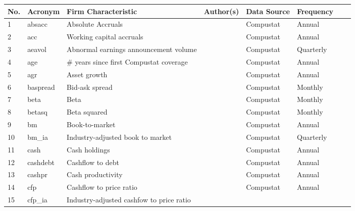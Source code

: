 \documentclass[a4paper, table]{article}
\begin{document}
\begin{landscape}
	\begin{center}
		\begin{longtable}{llllllll} \hline 
			No. & Acronym & Firm Characteristic & Author(s) & Data Source & Frequency \\ \hline
			1 & absacc\footnotemark[\value{footnote}] & Absolute Accruals & 
				\cite{bandyopadhyay_accrual_2010} & Compustat & Annual \\
			2 & acc\footnotemark[\value{footnote}] & Working capital accruals & 
				\cite{sloan_stock_1996} & Compustat & Annual \\
			3 & aeavol & Abnormal earnings announcement volume & 
				\cite{lerman_high-volume_2008} & Compustat & Quarterly \\
			4 & age & \# years since first Compustat coverage & 
				\cite{jiang_information_2005} & Compustat & Annual \\
			5 & agr & Asset growth & 
				\cite{cooper_asset_2008} & Compustat & Annual \\
			6 & baspread & Bid-ask spread & 
				\cite{amihud_effects_1989} & Compustat & Monthly \\
			7 & beta & Beta & 
				\cite{fama_risk_1973} & Compustat & Monthly \\
			8 & betasq & Beta squared & 
				\cite{fama_risk_1973} & Compustat & Monthly \\
			9 & bm & Book-to-market & 
				\cite{rosenberg_persuasive_1985} & Compustat & Annual \\
			10 & bm\_ia & Industry-adjusted book to market & 
				\cite{asness_predicting_2000} & Compustat & Quarterly \\
			11 & cash & Cash holdings & 
				\cite{palazzo_cash_2012} & Compustat & Annual \\
			12 & cashdebt & Cashflow to debt & 
				\cite{ou_financial_1989} & Compustat & Annual \\
			13 & cashpr & Cash productivity & 
				\cite{chandrashekar_productivity_2009} & Compustat & Annual \\
			14 & cfp\footnotemark[\value{footnote}] & Cashflow to price ratio & 
				\cite{desai_value-glamour_2004} & Compustat & Annual \\
			15 & cfp\_ia\footnotemark[\value{footnote}] & Industry-adjusted cashfow to price ratio & 

\end{longtable}
\end{center}
\end{landscape}
\end{document}
